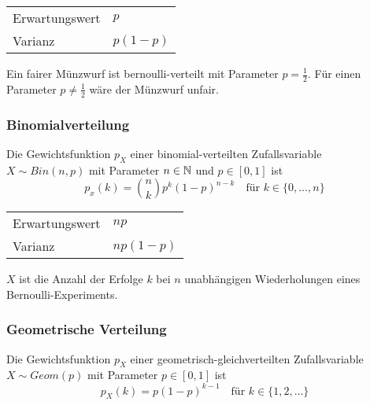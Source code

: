 \begin{highlight}
	\begin{tabular}{l@{ : }l}
		Erwartungswert & \(p\)      \\
		Varianz        & \(p(1-p)\)
	\end{tabular}
\end{highlight}

\begin{example}[Münzwurf] Ein fairer Münzwurf ist bernoulli-verteilt mit Parameter \(p=\frac{1}{2}\). Für einen Parameter \(p \neq \frac{1}{2}\) wäre der Münzwurf unfair.
\end{example}




\subsubsection{Binomialverteilung}

Die Gewichtsfunktion \(p_X\) einer binomial-verteilten Zufallsvariable \(X \sim Bin(n,p)\) mit Parameter \(n \in \mathbb{N}\) und \(p \in [0,1]\) ist
\[
	p_x(k) = {n \choose k} p^k (1-p)^{n-k}
	\quad
	\text{für } k \in \{0,\ldots,n\}
\]

\begin{highlight}
	\begin{tabular}{l@{ : }l}
		Erwartungswert & \(np\)      \\
		Varianz        & \(np(1-p)\)
	\end{tabular}
\end{highlight}

\(X\) ist die Anzahl der Erfolge \(k\) bei \(n\) unabhängigen Wiederholungen eines Bernoulli-Experiments.




\subsubsection{Geometrische Verteilung}

Die Gewichtsfunktion \(p_X\) einer geometrisch-gleichverteilten Zufallsvariable \(X \sim Geom(p)\)  mit Parameter \(p \in [0,1]\) ist
\[
	p_X(k) = p(1-p)^{k-1}
	\quad
	\text{für } k \in \{1,2,\ldots\}
\]

